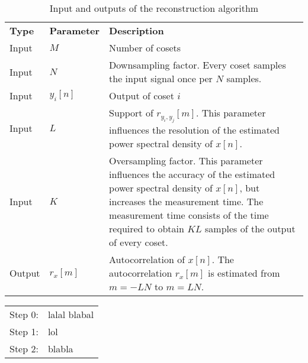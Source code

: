 \documentclass[a4paper, openany, oneside]{memoir}
\begin{document}
\begin{table}
    \centering
    \begin{tabularx}{\textwidth}{llY}
        \textbf{Type} & \textbf{Parameter} & \textbf{Description} \\
        Input & $M$ & Number of cosets \\
        Input & $N$ & Downsampling factor. Every coset samples the input signal once per $N$ samples. \\
        Input & $y_i[n]$ & Output of coset $i$ \\
        Input & $L$ & Support of $r_{y_i,y_j}[m]$. This parameter influences the resolution of the estimated power spectral density of $x[n]$. \\
        Input & $K$ & Oversampling factor. This parameter influences the accuracy of the estimated power spectral density of $x[n]$, but increases the measurement time. The measurement time consists of the time required to obtain $KL$ samples of the output of every coset. \\
        Output & $r_x[m]$ & Autocorrelation of $x[n]$. The autocorrelation $r_x[m]$ is estimated from $m=-LN$ to $m=LN$.
    \end{tabularx}
    \caption{Input and outputs of the reconstruction algorithm}
    \label{tab:reconstruction-algorithm-inputs-outputs}
\end{table}

\begin{tabularx}{\textwidth}{rY}
    Step 0: & lalal \newline blabal \\
    Step 1: & lol \\
    Step 2: & blabla
\end{tabularx}





\end{document}
